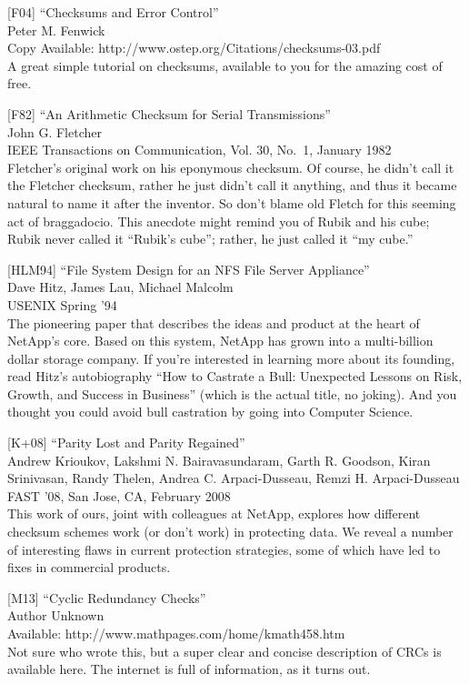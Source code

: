 {[}F04{]} ``Checksums and Error Control''\\
Peter M. Fenwick\\
Copy Available: http://www.ostep.org/Citations/checksums-03.pdf\\
A great simple tutorial on checksums, available to you for the amazing
cost of free.

{[}F82{]} ``An Arithmetic Checksum for Serial Transmissions''\\
John G. Fletcher\\
IEEE Transactions on Communication, Vol. 30, No.~1, January 1982\\
Fletcher's original work on his eponymous checksum. Of course, he didn't
call it the Fletcher checksum, rather he just didn't call it anything,
and thus it became natural to name it after the inventor. So don't blame
old Fletch for this seeming act of braggadocio. This anecdote might
remind you of Rubik and his cube; Rubik never called it ``Rubik's
cube''; rather, he just called it ``my cube.''

{[}HLM94{]} ``File System Design for an NFS File Server Appliance''\\
Dave Hitz, James Lau, Michael Malcolm\\
USENIX Spring '94\\
The pioneering paper that describes the ideas and product at the heart
of NetApp's core. Based on this system, NetApp has grown into a
multi-billion dollar storage company. If you're interested in learning
more about its founding, read Hitz's autobiography ``How to Castrate a
Bull: Unexpected Lessons on Risk, Growth, and Success in Business''
(which is the actual title, no joking). And you thought you could avoid
bull castration by going into Computer Science.

{[}K+08{]} ``Parity Lost and Parity Regained''\\
Andrew Krioukov, Lakshmi N. Bairavasundaram, Garth R. Goodson, Kiran
Srinivasan, Randy Thelen, Andrea C. Arpaci-Dusseau, Remzi H.
Arpaci-Dusseau\\
FAST '08, San Jose, CA, February 2008\\
This work of ours, joint with colleagues at NetApp, explores how
different checksum schemes work (or don't work) in protecting data. We
reveal a number of interesting flaws in current protection strategies,
some of which have led to fixes in commercial products.

{[}M13{]} ``Cyclic Redundancy Checks''\\
Author Unknown\\
Available: http://www.mathpages.com/home/kmath458.htm\\
Not sure who wrote this, but a super clear and concise description of
CRCs is available here. The internet is full of information, as it turns
out.

